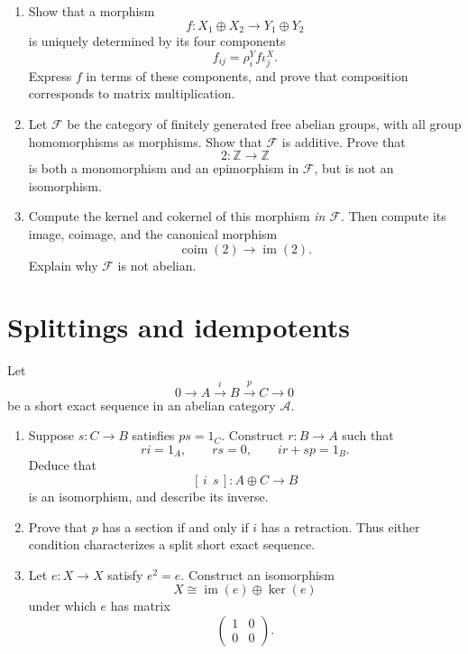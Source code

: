 \documentclass[11pt]{article}
\DeclareMathOperator{\im}{im}
\DeclareMathOperator{\coim}{coim}
\newcommand{\Z}{\mathbb{Z}}
\begin{document}
\begin{enumerate}
\item Show that a morphism
\[
f:X_1\oplus X_2\longrightarrow Y_1\oplus Y_2
\]
is uniquely determined by its four components
\[
f_{ij}=\rho_i^Y f\iota_j^X.
\]
Express \(f\) in terms of these components, and prove that composition
corresponds to matrix multiplication.

\item Let \(\mathcal F\) be the category of finitely generated free
abelian groups, with all group homomorphisms as morphisms. Show that
\(\mathcal F\) is additive. Prove that
\[
2:\Z\longrightarrow\Z
\]
is both a monomorphism and an epimorphism in \(\mathcal F\), but is not
an isomorphism.

\item Compute the kernel and cokernel of this morphism \emph{in
\(\mathcal F\)}. Then compute its image, coimage, and the canonical morphism
\[
\coim(2)\longrightarrow\im(2).
\]
Explain why \(\mathcal F\) is not abelian.
\end{enumerate}

\section{Splittings and idempotents}
Let
\[
0\longrightarrow A\xrightarrow{i}B\xrightarrow{p}C\longrightarrow0
\]
be a short exact sequence in an abelian category \(\mathcal A\).
\begin{enumerate}
\item Suppose \(s:C\to B\) satisfies \(ps=1_C\). Construct \(r:B\to A\)
such that
\[
ri=1_A,\qquad rs=0,\qquad ir+sp=1_B.
\]
Deduce that
\[
[\,i\ \ s\,]:A\oplus C\longrightarrow B
\]
is an isomorphism, and describe its inverse.

\item Prove that \(p\) has a section if and only if \(i\) has a retraction.
Thus either condition characterizes a split short exact sequence.

\item Let \(e:X\to X\) satisfy \(e^2=e\). Construct an isomorphism
\[
X\cong\im(e)\oplus\ker(e)
\]
under which \(e\) has matrix
\[
\begin{pmatrix}1&0\\0&0\end{pmatrix}.
\]
\end{enumerate}
\end{document}
